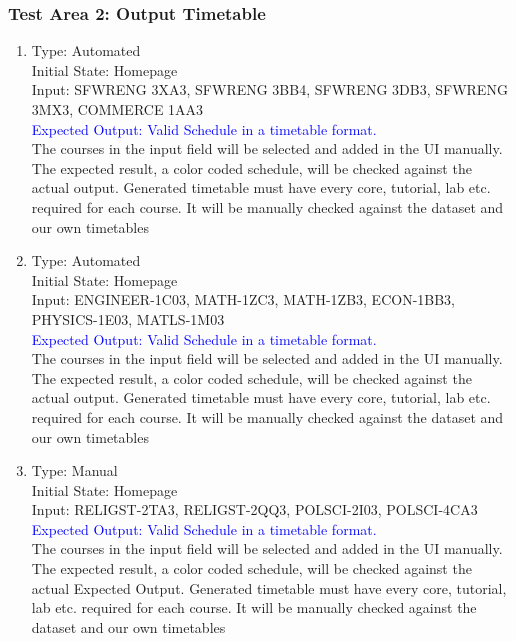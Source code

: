 \documentclass[11pt, oneside]{article}   	%
\begin{document}
\subsubsection{Test Area 2: Output Timetable}
\begin{enumerate}
\item Type: Automated \\
Initial State: Homepage \\
Input: SFWRENG 3XA3, SFWRENG 3BB4, SFWRENG 3DB3, SFWRENG 3MX3, COMMERCE 1AA3 \\
\textcolor{blue}{Expected Output: Valid Schedule in a timetable format.} \\
The courses in the input field will be selected and added in the UI manually. The expected result, a color coded schedule, will be checked against the actual output. Generated timetable must have every core, tutorial, lab etc. required for each course. It will be manually checked against the dataset and our own timetables \\

\item Type: Automated \\
Initial State: Homepage \\
Input:  ENGINEER-1C03, MATH-1ZC3, MATH-1ZB3,  ECON-1BB3, PHYSICS-1E03, MATLS-1M03 \\
\textcolor{blue}{Expected Output: Valid Schedule in a timetable format.} \\
The courses in the input field will be selected and added in the UI manually. The expected result, a color coded schedule, will be checked against the actual output. Generated timetable must have every core, tutorial, lab etc. required for each course. It will be manually checked against the dataset and our own timetables \\

\item Type: Manual \\
Initial State: Homepage \\
Input: RELIGST-2TA3, RELIGST-2QQ3, POLSCI-2I03, POLSCI-4CA3\\
\textcolor{blue}{Expected Output: Valid Schedule in a timetable format.} \\
The courses in the input field will be selected and added in the UI manually. The expected result, a color coded schedule, will be checked against the actual Expected Output. Generated timetable must have every core, tutorial, lab etc. required for each course. It will be manually checked against the dataset and our own timetables \\


\end{enumerate}
\end{document}

